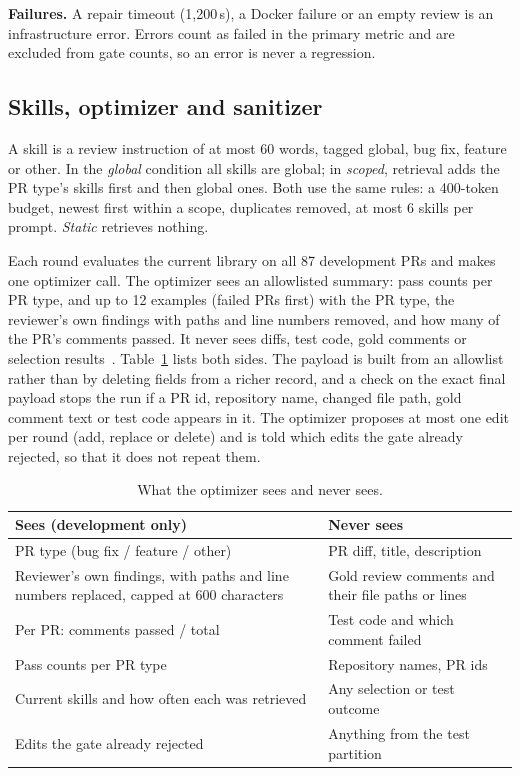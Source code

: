 \documentclass[sigconf, authorversion, nonacm]{acmart}
\begin{document}
\textbf{Failures.} A repair timeout (1,200\,s), a Docker failure or an empty review is an infrastructure error. Errors count as failed in the primary metric and are excluded from gate counts, so an error is never a regression.

\subsection{Skills, optimizer and sanitizer}
A skill is a review instruction of at most 60 words, tagged global, bug fix, feature or other. In the \emph{global} condition all skills are global; in \emph{scoped}, retrieval adds the PR type's skills first and then global ones. Both use the same rules: a 400-token budget, newest first within a scope, duplicates removed, at most 6 skills per prompt. \emph{Static} retrieves nothing.

Each round evaluates the current library on all 87 development PRs and makes one optimizer call. The optimizer sees an allowlisted summary: pass counts per PR type, and up to 12 examples (failed PRs first) with the PR type, the reviewer's own findings with paths and line numbers removed, and how many of the PR's comments passed. It never sees diffs, test code, gold comments or selection results~\cite{kapoor2023leakage}. Table~\ref{tab:sanitizer} lists both sides. The payload is built from an allowlist rather than by deleting fields from a richer record, and a check on the exact final payload stops the run if a PR id, repository name, changed file path, gold comment text or test code appears in it. The optimizer proposes at most one edit per round (add, replace or delete) and is told which edits the gate already rejected, so that it does not repeat them.

\begin{table}[t]
\caption{What the optimizer sees and never sees.}
\label{tab:sanitizer}
\small
\begin{tabular}{p{}p{}}
\toprule
Sees (development only) & Never sees \\
\midrule
PR type (bug fix / feature / other) & PR diff, title, description \\
Reviewer's own findings, with paths and line numbers replaced, capped at 600 characters & Gold review comments and their file paths or lines \\
Per PR: comments passed / total & Test code and which comment failed \\
Pass counts per PR type & Repository names, PR ids \\
Current skills and how often each was retrieved & Any selection or test outcome \\
Edits the gate already rejected & Anything from the test partition \\
\bottomrule
\end{tabular}
\end{table}
\end{document}
